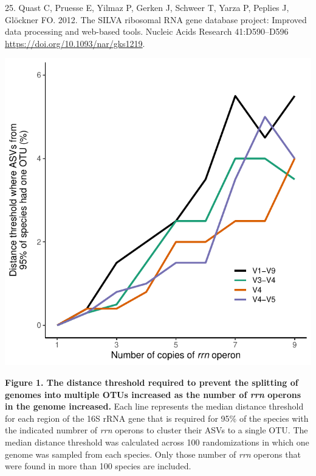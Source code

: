 \documentclass[
]{article}
\newenvironment{cslreferences}%
  {}%
  {\par}
\begin{document}
\begin{cslreferences}
\leavevmode\hypertarget{ref-Quast2012}{}%
25. Quast C, Pruesse E, Yilmaz P, Gerken J, Schweer T, Yarza P, Peplies
J, Glöckner FO. 2012. The SILVA ribosomal RNA gene database project:
Improved data processing and web-based tools. Nucleic Acids Research
41:D590--D596 \url{https://doi.org/10.1093/nar/gks1219}.
\end{cslreferences}

\setlength{\parindent}{0in}
\setlength{\leftskip}{0in}

\newpage

\includegraphics{../figures/copy_number_threshold_plot.pdf}

\textbf{Figure 1. The distance threshold required to prevent the
splitting of genomes into multiple OTUs increased as the number of
\emph{rrn} operons in the genome increased.} Each line represents the
median distance threshold for each region of the 16S rRNA gene that is
required for 95\% of the species with the indicated numbrer of
\emph{rrn} operons to cluster their ASVs to a single OTU. The median
distance threshold was calculated across 100 randomizations in which one
genome was sampled from each species. Only those number of \emph{rrn}
operons that were found in more than 100 species are included.

\newpage
\end{document}
